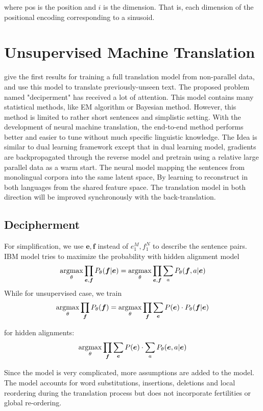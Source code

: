 where pos is the position and $i$ is the dimension. That is, each dimension of the positional encoding corresponding to a sinusoid.

\section{Unsupervised Machine Translation}
give the first results for training a full translation model from non-parallel data, and use this model to translate previously-unseen text. The proposed problem named "deciperment" has received a lot of attention. This model contains many statistical methods, like EM algorithm or Bayesian method. However, this method is limited to rather short sentences and simplistic setting. With the development of neural machine translation, the end-to-end method performs better and easier to tune without much specific linguistic knowledge. The Idea is similar to dual learning framework except that in dual learning model, gradients are backpropagated through the reverse model and pretrain using a relative large parallel data as a warm start. The neural model mapping the sentences from monolingual corpora into the same latent space, By learning to reconstruct in both languages from the shared feature space. The translation model in both direction will be improved synchronously with the back-translation.

\subsection{Decipherment}
For simplification, we use $\bm{e}, \bm{f}$ instead of $e_1^M, f_1^N$ to describe the sentence pairs. IBM model tries to maximize the probability with hidden alignment model
\[ \underset{\theta}{\operatorname{argmax}} \prod_{\bm{e}, \bm{f}} {P_{\theta}(\bm{f}|\bm{e})} = \underset{\theta}{\operatorname{argmax}} \prod_{\bm{e}, \bm{f}} \sum_{a} P_{\theta}(\bm{f}, a| \bm{e})  \]
While for unsupervised case, we train 
\[ \underset{\theta}{\operatorname{argmax}} \prod_{\bm{f}}P_{\theta}(\bm{f})= \underset{\theta}{\operatorname{argmax}} \prod_{\bm{f}} \sum_{\bm{e}} P(\bm{e}) \cdot P_{\theta}(\bm{f}|\bm{e})\]

for hidden alignments: \[ \underset{\theta}{\operatorname{argmax}} \prod_{\bm{f}} \sum_{\bm{e}} P(\bm{e}) \cdot \sum_{a} P_{\theta}(\bm{e},a|\bm{e}) \]

Since the model is very complicated, more assumptions are added to the model. The model accounts for word substitutions, insertions, deletions and local reordering during the translation process but does not incorporate fertilities or global re-ordering.\\


